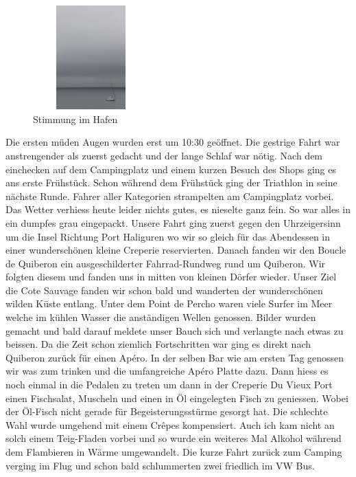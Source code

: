 \begin{figure} 
  \begin{centering}
    \includegraphics[width=0.4\textwidth, height=4cm, keepaspectratio]{../Bilder/Bretagne/6.jpg}
    \caption{Stimmung im Hafen}
  \end{centering}
\end{figure} 

Die ersten müden Augen wurden erst um 10:30 geöffnet.
Die gestrige Fahrt war anstrengender als zuerst gedacht und der lange Schlaf war nötig.
Nach dem einchecken auf dem Campingplatz und einem kurzen Besuch des Shops ging es ans erste Frühstück.
Schon während dem Frühstück ging der Triathlon in seine nächste Runde.
Fahrer aller Kategorien strampelten am Campingplatz vorbei.
Das Wetter verhiess heute leider nichts gutes, es nieselte ganz fein.
So war alles in ein dumpfes grau eingepackt.
Unsere Fahrt ging zuerst gegen den Uhrzeigersinn um die Insel Richtung Port Haliguren wo wir so gleich für das Abendessen in einer wunderschönen kleine Creperie reservierten.
Danach fanden wir den \glqq Boucle de Quiberon\grqq{} ein ausgeschilderter Fahrrad-Rundweg rund um Quiberon.
Wir folgten diesem und fanden uns in mitten von kleinen Dörfer wieder.
Unser Ziel die \glqq Cote Sauvage\grqq{} fanden wir schon bald und wanderten der wunderschönen wilden Küste entlang.
Unter dem \glqq Point de Percho\grqq{} waren viele Surfer im Meer welche im kühlen Wasser die anständigen Wellen genossen.
Bilder wurden gemacht und bald darauf meldete unser Bauch sich und verlangte nach etwas zu beissen.
Da die Zeit schon ziemlich Fortschritten war ging es direkt nach Quiberon zurück für einen Apéro.
In der selben Bar wie am ersten Tag genossen wir was zum trinken und die umfangreiche Apéro Platte dazu.
Dann hiess es noch einmal in die Pedalen zu treten um dann in der Creperie \glqq Du Vieux Port\grqq{} einen Fischsalat, Muscheln und einen in Öl eingelegten Fisch zu geniessen.
Wobei der Öl-Fisch nicht gerade für Begeisterungsstürme gesorgt hat.
Die schlechte Wahl wurde umgehend mit einem Cr\^{e}pes kompensiert.
Auch ich kam nicht an solch einem Teig-Fladen vorbei und so wurde ein weiteres Mal Alkohol während dem Flambieren in Wärme umgewandelt.
Die kurze Fahrt zurück zum Camping verging im Flug und schon bald schlummerten zwei friedlich im VW Bus.

